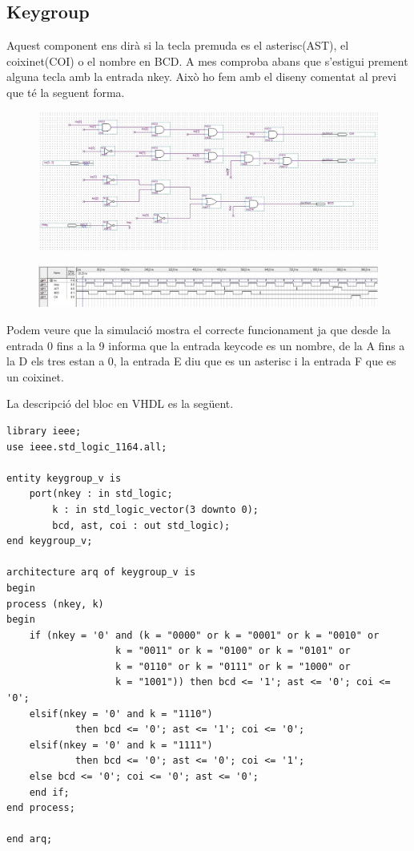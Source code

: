\documentclass[12pt, a4papre]{article}
\begin{document}
	\subsection{Keygroup}
	
	Aquest component ens dirà si la tecla premuda es el asterisc(AST), el coixinet(COI) o el nombre en BCD. A mes comproba abans que s'estigui prement alguna tecla amb la entrada nkey. Això ho fem amb el diseny comentat al previ que té la seguent forma.
	
	\begin{figure}[H]
		\begin{center}
		\includegraphics[width=130mm]{Keycode.jpeg}
		\end{center}
	\end{figure}
	
	\begin{figure}[H]
		\begin{center}
		\includegraphics[width=130mm]{KCsim.jpeg}
		\end{center}
	\end{figure}
	
	Podem veure que la simulació mostra el correcte funcionament ja que desde la entrada 0 fins a la 9 informa que la entrada keycode es un nombre, de la A fins a la D els tres estan a 0, la entrada E diu que es un asterisc i la entrada F que es un coixinet.
	
	La descripció del bloc en VHDL es la següent.
	
		\begin{lstlisting}[style=vhdl, frame=single, basicstyle=\tiny]
library ieee;
use ieee.std_logic_1164.all;

entity keygroup_v is
	port(nkey : in std_logic;
		k : in std_logic_vector(3 downto 0);
		bcd, ast, coi : out std_logic);
end keygroup_v;

architecture arq of keygroup_v is
begin
process (nkey, k)
begin
	if (nkey = '0' and (k = "0000" or k = "0001" or k = "0010" or
				   k = "0011" or k = "0100" or k = "0101" or
				   k = "0110" or k = "0111" or k = "1000" or
				   k = "1001")) then bcd <= '1'; ast <= '0'; coi <= '0';
	elsif(nkey = '0' and k = "1110")
			then bcd <= '0'; ast <= '1'; coi <= '0';
	elsif(nkey = '0' and k = "1111")
			then bcd <= '0'; ast <= '0'; coi <= '1';
	else bcd <= '0'; coi <= '0'; ast <= '0';
	end if;
end process;

end arq;
\end{lstlisting}
	
\end{document}

